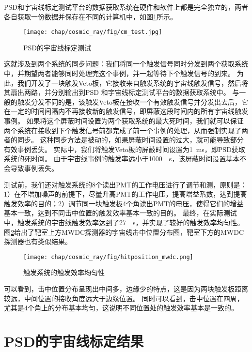 PSD和宇宙线标定测试平台的数据获取系统在硬件和软件上都是完全独立的，两者各自获取一份数据并保存在不同的计算机中，如图\ref{fig:cosmic_ray:cm_test}所示。
\label{sec:cosmic_ray:cm_test}
\begin{figure}[htbp]
	\centering
	\texttt{[image: chap/cosmic\_ray/fig/cm\_test.jpg]}
	\caption{PSD的宇宙线标定测试}
	\label{fig:cosmic_ray:cm_test}
\end{figure}
这就涉及到两个系统的同步问题：我们将同一个触发信号同时分发到两个获取系统中，并期望两者能够同时处理完这个事例，并一起等待下个触发信号的到来。
为此，我们开发了一块触发Veto板，它接收来自触发系统的宇宙线触发信号，然后将其扇出两路，并分别输出到PSD
和宇宙线标定测试平台的数据获取系统中。
与一般的触发分发不同的是，该触发Veto板在接收一个有效触发信号并分发出去后，它在一定的时间间隔内不再接收新的触发信号，即屏蔽这段时间内的所有宇宙线触发事例。
如果将这个屏蔽时间设置为两个获取系统的最大死时间，我们就可以保证两个系统在接收到下个触发信号前都完成了前一个事例的处理，从而强制实现了两者的同步。
这种同步方法是被动的，如果屏蔽时间设置的过大，就可能导致部分有效事例丢失。
实际中，我们将触发Veto板的屏蔽时间设置为\SI{1}{ms}，即PSD获取系统的死时间。
由于宇宙线事例的触发率远小于\SI{1000}{\per\second}，该屏蔽时间设置基本不会导致事例丢失。

测试前，我们还对触发系统的8个读出PMT的工作电压进行了调节和测，原则是：1）在不增加噪声的前提下，尽量升高PMT的工作电压，提高增益系数，达到提高触发效率的目的；2）调节同一块触发板4个角读出PMT的电压，使得它们的增益基本一致，达到不同击中位置的触发效率基本一致的目的。
最终，在实际测试中，触发系统的宇宙线触发效率达到了\SI{27}{\per\second}，并实现了较好的触发效率均匀性。
图\ref{fig:cosmic_ray:hitposition}给出了靶室上方MWDC探测器的宇宙线击中位置分布图，靶室下方的MWDC探测器也有类似结果。
\begin{figure}[htb]
\centering
\texttt{[image: chap/cosmic\_ray/fig/hitposition\_mwdc.png]}
\caption{触发系统的触发效率均匀性}
\label{fig:cosmic_ray:hitposition}
\end{figure}
可以看到，击中位置分布呈现出中间多，边缘少的特点，这是因为两块触发板距离较远，中间位置的接收角度远大于边缘位置。
同时可以看到，击中位置在四周，尤其是4个角上的分布基本均匀，这说明不同位置处的触发效率基本是一致的。

\section{PSD的宇宙线标定结果}
\label{sec:cosmic_ray:results}
